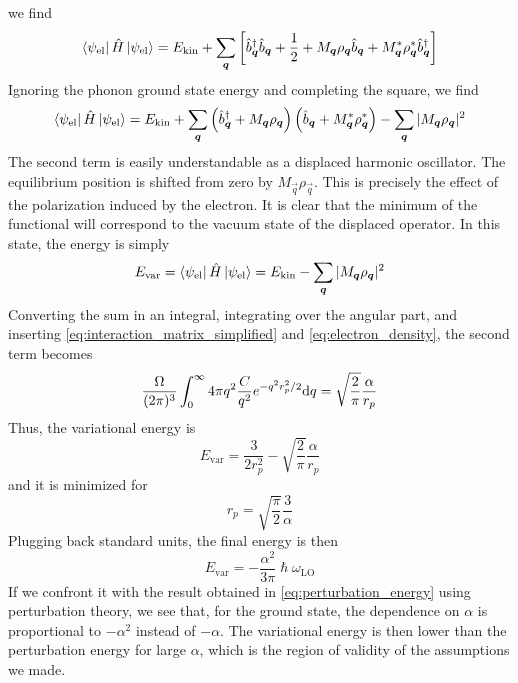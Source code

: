 we find
\begin{equation}
    \bra{\psi_\text{el}} \hat{H} \ket{\psi_\text{el}} = E_\text{kin} + \sum_{\mathbf{\boldsymbol{q}}} \left[  \hat{b}^\dagger_{ \mathbf{\boldsymbol{q}}} \hat{b}_{ \mathbf{\boldsymbol{q}}} + \frac{1}{2} + M_{\mathbf{\boldsymbol{q}}} \rho_{\mathbf{\boldsymbol{q}}} \hat{b}_{\mathbf{\boldsymbol{q}}} +  M^*_{\mathbf{\boldsymbol{q}}} \rho^*_{\mathbf{\boldsymbol{q}}} \hat{b}^\dagger_{\mathbf{\boldsymbol{q}}} \right]
\end{equation}
Ignoring the phonon ground state energy and completing the square, we find
\begin{equation}
    \bra{\psi_\text{el}} \hat{H} \ket{\psi_\text{el}} = E_\text{kin} + \sum_{\mathbf{\boldsymbol{q}}} \left( \hat{b}^\dagger_{\mathbf{\boldsymbol{q}}} + M_{\mathbf{\boldsymbol{q}}}\rho_{\mathbf{\boldsymbol{q}}} \right)\left( \hat{b}_{\mathbf{\boldsymbol{q}}} + M^*_{\mathbf{\boldsymbol{q}}}\rho^*_{\mathbf{\boldsymbol{q}}} \right) - \sum_{\mathbf{\boldsymbol{q}}} |M_{\mathbf{\boldsymbol{q}}}\rho_{\mathbf{\boldsymbol{q}}}|^2
\end{equation}
The second term is easily understandable as a displaced harmonic oscillator. The equilibrium position is shifted from zero by $M_\vec{q}\rho_\vec{q}$. This is precisely the effect of the polarization induced by the electron. It is clear that the minimum of the functional will correspond to the vacuum state of the displaced operator. In this state, the energy is simply
\begin{equation}
    E_\text{var} = \bra{\psi_\text{el}} \hat{H} \ket{\psi_\text{el}} = E_\text{kin} - \sum_{\mathbf{\boldsymbol{q}}} |M_{\mathbf{\boldsymbol{q}}}\rho_{\mathbf{\boldsymbol{q}}}|^2
\end{equation}
Converting the sum in an integral, integrating over the angular part, and inserting \cref{eq:interaction_matrix_simplified} and \cref{eq:electron_density}, the second term becomes
\begin{equation}
    \frac{\Omega}{(2\pi)^3} \int_0^\infty  4\pi q^2 \frac{C}{q^2} e^{-q^2r_p^2/2} \differential q = \sqrt{\frac{2}{\pi}} \frac{\alpha}{r_p}
\end{equation}
Thus, the variational energy is
\begin{equation}
    E_\text{var} = \frac{3}{2r_p^2} - \sqrt{\frac{2}{\pi}} \frac{\alpha}{r_p}
\end{equation}
and it is minimized for
\begin{equation}
    r_p = \sqrt{\frac{\pi}{2}}\frac{3}{\alpha}
\end{equation}
Plugging back standard units, the final energy is then
\begin{equation}
    E_\text{var} = -\frac{\alpha^2}{3\pi} \hslash\omega_\text{LO}
\end{equation}
If we confront it with the result obtained in \cref{eq:perturbation_energy} using perturbation theory, we see that, for the ground state, the dependence on $\alpha$ is proportional to $-\alpha^2$ instead of $-\alpha$. The variational energy is then lower than the perturbation energy for large $\alpha$, which is the region of validity of the assumptions we made.